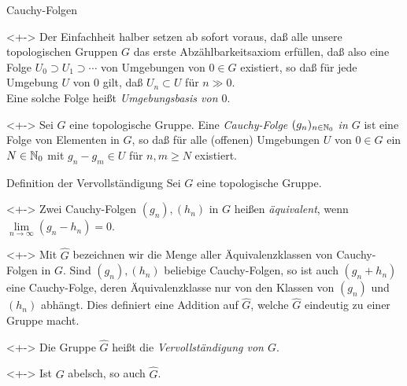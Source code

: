 \begin{frame}{Cauchy-Folgen}
	\begin{visibleenv}<+->
		Der Einfachheit halber setzen ab sofort voraus, daß alle unsere topologischen Gruppen \(G\) das
		erste Abzählbarkeitsaxiom erfüllen, daß also eine Folge \(U_0 \supset U_1 \supset \dotsb\)
		von Umgebungen von \(0 \in G\) existiert, so daß für jede
		Umgebung \(U\) von \(0\) gilt, daß \(U_n \subset U\) für \(n \gg 0\).
		\\
		Eine solche Folge heißt \emph{Umgebungsbasis von \(0\)}.
	\end{visibleenv}
	\begin{definition}<+->
		Sei \(G\) eine topologische Gruppe. Eine \emph{Cauchy-Folge \((g_n)_{n \in \mathbb N_0}\) in \(G\)}
		ist eine Folge von Elementen in \(G\), so daß für alle (offenen) Umgebungen \(U\) von \(0 \in G\)
		ein \(N \in \mathbb N_0\) mit \(g_n - g_m \in U\) für \(n, m \ge N\) existiert.
	\end{definition}
\end{frame}

\begin{frame}{Definition der Vervollständigung}
	Sei \(G\) eine topologische Gruppe.
	\begin{definition}<+->
		Zwei Cauchy-Folgen \((g_n), (h_n)\) in \(G\) heißen
		\emph{äquivalent}, wenn \(\lim\limits_{n \to \infty} (g_n - h_n) = 0\).
	\end{definition}
	\begin{visibleenv}<+->
		Mit \(\hat G\) bezeichnen wir die Menge aller Äquivalenzklassen von Cauchy-Folgen in \(G\).
		Sind \((g_n), (h_n)\) beliebige Cauchy-Folgen, so ist auch \((g_n + h_n)\) eine Cauchy-Folge, deren
		Äquivalenzklasse nur von den Klassen von \((g_n)\) und \((h_n)\) abhängt. Dies definiert eine
		Addition auf \(\hat G\), welche \(\hat G\) eindeutig zu einer Gruppe macht.
	\end{visibleenv}
	\begin{definition}<+->
		Die Gruppe \(\hat G\) heißt die \emph{Vervollständigung von \(G\)}.
	\end{definition}
	\begin{remark}<+->
		Ist \(G\) abelsch, so auch \(\hat G\).
	\end{remark}
\end{frame}

